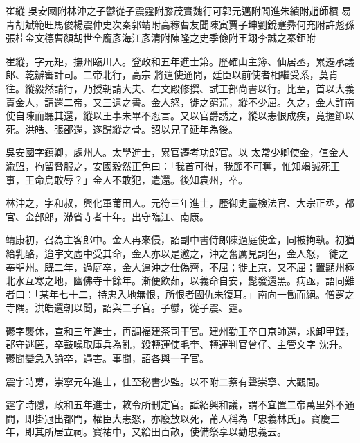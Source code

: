 
\begin{pinyinscope}

 崔縱
 吳安國附林沖之子鬱從子震霆附滕茂實魏行可郭元邁附閻進朱績附趙師檟
 易青胡斌範旺馬俊楊震仲史次秦郭靖附高稼曹友聞陳寅賈子坤劉銳蹇彞何充附許彪孫張桂金文德曹顏胡世全龐彥海江彥清附陳隆之史季儉附王翊李誠之秦鉅附



 崔縱，字元矩，撫州臨川人。登政和五年進士第。歷確山主簿、仙居丞，累遷承議郎、乾辦審計司。二帝北行，高宗
 將遣使通問，廷臣以前使者相繼受系，莫肯往。縱毅然請行，乃授朝請大夫、右文殿修撰、試工部尚書以行。比至，首以大義責金人，請還二帝，又三遺之書。金人怒，徙之窮荒，縱不少屈。久之，金人許南使自陳而聽其還，縱以王事未畢不忍言。又以官爵誘之，縱以恚恨成疾，竟握節以死。洪皓、張邵還，遂歸縱之骨。詔以兄子延年為後。



 吳安國字鎮卿，處州人。太學進士，累官遷考功郎官。以
 太常少卿使金，值金人渝盟，拘留脅服之，安國毅然正色曰：「我首可得，我節不可奪，惟知竭誠死王事，王命烏敢辱？」金人不敢犯，遣還。後知袁州，卒。



 林沖之，字和叔，興化軍莆田人。元符三年進士，歷御史臺檢法官、大宗正丞，都官、金部郎，滯省寺者十年。出守臨江、南康。



 靖康初，召為主客郎中。金人再來侵，詔副中書侍郎陳過庭使金，同被拘執。初猶給乳酪，迨宇文虛中受其命，金人亦以是邀之，沖之奮厲見詞色，金人怒，
 徙之奉聖州。既二年，過庭卒，金人逼沖之仕偽齊，不屈；徙上京，又不屈；置顯州極北水互寒之地，幽佛寺十餘年。漸便飲茹，以義命自安，髭發還黑。病亟，語同難者曰：「某年七十二，持忠入地無恨，所恨者國仇未復耳。」南向一慟而絕。僧窆之寺隅。洪皓還朝以聞，詔與二子官。子鬱，從子震、霆。



 鬱字襲休，宣和三年進士，再調福建茶司干官。建州勤王卒自京師還，求卸甲錢，郡守逃匿，卒鼓噪取庫兵為亂，殺轉運使毛奎、轉運判官曾仔、主管文字
 沈升。鬱聞變急入諭卒，遇害。事聞，詔各與一子官。



 震字時旉，崇寧元年進士，仕至秘書少監。以不附二蔡有聲崇寧、大觀間。



 霆字時隱，政和五年進士，敕令所刪定官。詆紹興和議，謂不宜置二帝萬里外不通問，即掛冠出都門，權臣大恚怒，亦廢放以死，莆人稱為「忠義林氏」。寶慶三年，即其所居立祠。寶祐中，又給田百畝，使備祭享以勸忠義云。




\end{pinyinscope}
